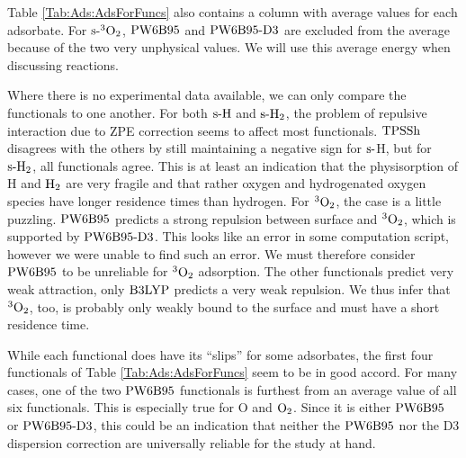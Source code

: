 \documentclass[8.5pt,twoside,twocolumn]{article}
\newcommand\sur{\enmat{\te{s-}}}
\newcommand\tripot{\enmat{{^3\ot}}}
\theoremstyle{standard}
\begin{document}
Table \ref{Tab:Ads:AdsForFuncs} also contains a column with average values
for each adsorbate.
For $\sur\tripot$, $\text{PW6B95}$ and $\text{PW6B95}\text{-D3}$ are excluded from the average because of
the two very unphysical values. We will use this average energy
when discussing reactions.

Where there is no experimental data available, we can only compare the
functionals to one another. For both $\sur\te H$ and $\sur\htw$, the
problem of repulsive interaction due to ZPE correction seems to affect
most functionals. $\text{TPSSh}$ disagrees with the others by still maintaining
a negative sign for $\sur$H, but for $\sur\htw$, all functionals agree.
This is at least an indication that the physisorption of H and $\text H_2$ are
very fragile and that rather oxygen and hydrogenated oxygen species
have longer residence times than hydrogen.
For $\tripot$, the case is a little puzzling. $\text{PW6B95}$ predicts a strong
repulsion between surface and $\tripot$, which is supported by
$\text{PW6B95}\text{-D3}$. This looks like an error in some computation script, however we were
unable to find such an error. We must therefore consider $\text{PW6B95}$
to be unreliable for $\tripot$ adsorption. The other
functionals predict very weak attraction, only $\text{B3LYP}$ predicts
a very weak repulsion. We thus infer that $\tripot$, too, is
probably only weakly bound to the surface and must have a short
residence time.

While each functional does have its ``slips'' for some adsorbates, the first four functionals of
Table \ref{Tab:Ads:AdsForFuncs} seem to be in good accord. 
For many cases, one of the two $\text{PW6B95}$ functionals is furthest from an average
value of all six functionals. This is especially true for O and $\text O_2$.
Since it is either $\text{PW6B95}$ or $\text{PW6B95}\text{-D3}$, this could be an indication
that neither the $\text{PW6B95}$ nor the D3 dispersion correction are universally
reliable for the study at hand.
\end{document}
